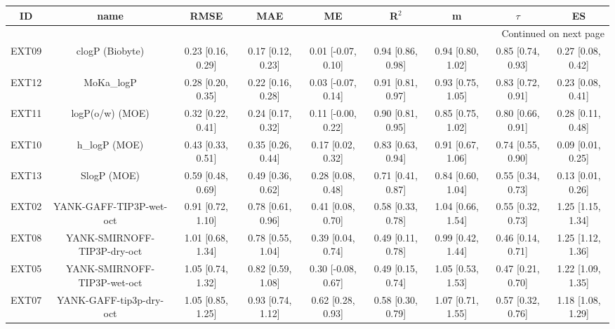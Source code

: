 \documentclass{article}
\begin{document}
\begin{center}
\scriptsize
\begin{longtable}{|ccccccccc|}
\toprule
    ID &                            name &               RMSE &                MAE &                   ME &              R$^2$ &                  m &             $\tau$ &                 ES \\
\midrule
\endhead
\midrule
\multicolumn{9}{r}{{Continued on next page}} \\
\midrule
\endfoot

\bottomrule
\endlastfoot
 EXT09 &                 clogP (Biobyte) &  0.23 [0.16, 0.29] &  0.17 [0.12, 0.23] &   0.01 [-0.07, 0.10] &  0.94 [0.86, 0.98] &  0.94 [0.80, 1.02] &  0.85 [0.74, 0.93] &  0.27 [0.08, 0.42] \\
 EXT12 &                      MoKa\_logP &  0.28 [0.20, 0.35] &  0.22 [0.16, 0.28] &   0.03 [-0.07, 0.14] &  0.91 [0.81, 0.97] &  0.93 [0.75, 1.05] &  0.83 [0.72, 0.91] &  0.23 [0.08, 0.41] \\
 EXT11 &                 logP(o/w) (MOE) &  0.32 [0.22, 0.41] &  0.24 [0.17, 0.32] &   0.11 [-0.00, 0.22] &  0.90 [0.81, 0.95] &  0.85 [0.75, 1.02] &  0.80 [0.66, 0.91] &  0.28 [0.11, 0.48] \\
 EXT10 &                   h\_logP (MOE) &  0.43 [0.33, 0.51] &  0.35 [0.26, 0.44] &    0.17 [0.02, 0.32] &  0.83 [0.63, 0.94] &  0.91 [0.67, 1.06] &  0.74 [0.55, 0.90] &  0.09 [0.01, 0.25] \\
 EXT13 &                     SlogP (MOE) &  0.59 [0.48, 0.69] &  0.49 [0.36, 0.62] &    0.28 [0.08, 0.48] &  0.71 [0.41, 0.87] &  0.84 [0.60, 1.04] &  0.55 [0.34, 0.73] &  0.13 [0.01, 0.26] \\
 EXT02 &         YANK-GAFF-TIP3P-wet-oct &  0.91 [0.72, 1.10] &  0.78 [0.61, 0.96] &    0.41 [0.08, 0.70] &  0.58 [0.33, 0.78] &  1.04 [0.66, 1.54] &  0.55 [0.32, 0.73] &  1.25 [1.15, 1.34] \\
 EXT08 &     YANK-SMIRNOFF-TIP3P-dry-oct &  1.01 [0.68, 1.34] &  0.78 [0.55, 1.04] &    0.39 [0.04, 0.74] &  0.49 [0.11, 0.78] &  0.99 [0.42, 1.44] &  0.46 [0.14, 0.71] &  1.25 [1.12, 1.36] \\
 EXT05 &     YANK-SMIRNOFF-TIP3P-wet-oct &  1.05 [0.74, 1.32] &  0.82 [0.59, 1.08] &   0.30 [-0.08, 0.67] &  0.49 [0.15, 0.74] &  1.05 [0.53, 1.53] &  0.47 [0.21, 0.70] &  1.22 [1.09, 1.35] \\
 EXT07 &         YANK-GAFF-tip3p-dry-oct &  1.05 [0.85, 1.25] &  0.93 [0.74, 1.12] &    0.62 [0.28, 0.93] &  0.58 [0.30, 0.79] &  1.07 [0.71, 1.55] &  0.57 [0.32, 0.76] &  1.18 [1.08, 1.29] \\

\end{longtable}
\end{center}
\end{document}
